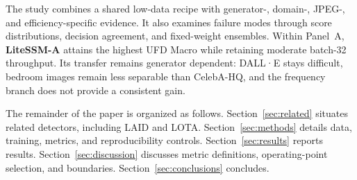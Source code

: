 The study combines a shared low-data recipe with generator-, domain-, JPEG-, and efficiency-specific evidence. It also examines failure modes through score distributions, decision agreement, and fixed-weight ensembles.
Within Panel~A, \textbf{LiteSSM-A} attains the highest UFD Macro while retaining moderate batch-32 throughput. Its transfer remains generator dependent: DALL·E stays difficult, bedroom images remain less separable than CelebA-HQ, and the frequency branch does not provide a consistent gain.

The remainder of the paper is organized as follows.
Section~\ref{sec:related} situates related detectors, including LAID and LOTA.
Section~\ref{sec:methods} details data, training, metrics, and reproducibility controls.
Section~\ref{sec:results} reports results.
Section~\ref{sec:discussion} discusses metric definitions, operating-point selection, and boundaries.
Section~\ref{sec:conclusions} concludes.
